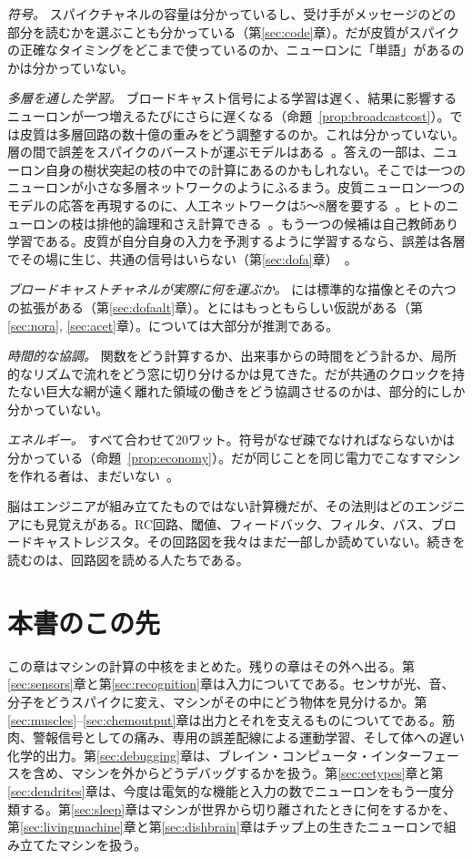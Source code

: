 \emph{符号。} スパイクチャネルの容量は分かっているし、受け手がメッセージのどの部分を読むかを選ぶことも分かっている（第\ref{sec:code}章）。だが皮質がスパイクの正確なタイミングをどこまで使っているのか、ニューロンに「単語」があるのかは分かっていない。

\emph{多層を通した学習。} ブロードキャスト信号による学習は遅く、結果に影響するニューロンが一つ増えるたびにさらに遅くなる（命題~\ref{prop:broadcastcost}）。では皮質は多層回路の数十億の重みをどう調整するのか。これは分かっていない。層の間で誤差をスパイクのバーストが運ぶモデルはある~\cite{Payeur2021}。答えの一部は、ニューロン自身の樹状突起の枝の中での計算にあるのかもしれない。そこでは一つのニューロンが小さな多層ネットワークのようにふるまう。皮質ニューロン一つのモデルの応答を再現するのに、人工ネットワークは5〜8層を要する~\cite{Beniaguev2021}。ヒトのニューロンの枝は排他的論理和さえ計算できる~\cite{Gidon2020}。もう一つの候補は自己教師あり学習である。皮質が自分自身の入力を予測するように学習するなら、誤差は各層でその場に生じ、共通の信号はいらない（第\ref{sec:dofa}章）~\cite{Keller2018}。

\emph{ブロードキャストチャネルが実際に何を運ぶか。} には標準的な描像とその六つの拡張がある（第\ref{sec:dofaalt}章）。とにはもっともらしい仮説がある（第\ref{sec:nora}, \ref{sec:acet}章）。については大部分が推測である。

\emph{時間的な協調。} 関数をどう計算するか、出来事からの時間をどう計るか、局所的なリズムで流れをどう窓に切り分けるかは見てきた。だが共通のクロックを持たない巨大な網が遠く離れた領域の働きをどう協調させるのかは、部分的にしか分かっていない。

\emph{エネルギー。} すべて合わせて20ワット。符号がなぜ疎でなければならないかは分かっている（命題~\ref{prop:economy}）。だが同じことを同じ電力でこなすマシンを作れる者は、まだいない~\cite{MehonicKenyon2022}。

脳はエンジニアが組み立てたものではない計算機だが、その法則はどのエンジニアにも見覚えがある。RC回路、閾値、フィードバック、フィルタ、バス、ブロードキャストレジスタ。その回路図を我々はまだ一部しか読めていない。続きを読むのは、回路図を読める人たちである。

\section{本書のこの先}

この章はマシンの計算の中核をまとめた。残りの章はその外へ出る。第\ref{sec:sensors}章と第\ref{sec:recognition}章は入力についてである。センサが光、音、分子をどうスパイクに変え、マシンがその中にどう物体を見分けるか。第\ref{sec:muscles}--\ref{sec:chemoutput}章は出力とそれを支えるものについてである。筋肉、警報信号としての痛み、専用の誤差配線による運動学習、そして体への遅い化学的出力。第\ref{sec:debugging}章は、ブレイン・コンピュータ・インターフェースを含め、マシンを外からどうデバッグするかを扱う。第\ref{sec:eetypes}章と第\ref{sec:dendrites}章は、今度は電気的な機能と入力の数でニューロンをもう一度分類する。第\ref{sec:sleep}章はマシンが世界から切り離されたときに何をするかを、第\ref{sec:livingmachine}章と第\ref{sec:dishbrain}章はチップ上の生きたニューロンで組み立てたマシンを扱う。

